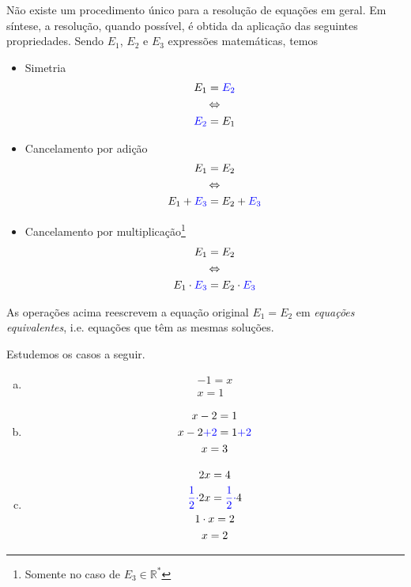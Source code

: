 Não existe um procedimento único para a resolução de equações em geral. Em síntese, a resolução, quando possível, é obtida da aplicação das seguintes propriedades. Sendo $E_1$, $E_2$ e $E_3$ expressões matemáticas, temos
\begin{itemize}
\item Simetria
  \begin{equation}
    \begin{gathered}
      E_1 = {\color{blue}E_2} \\
      \Leftrightarrow \\
      {\color{blue}E_2} = E_1
    \end{gathered}
\end{equation}
\item Cancelamento por adição
  \begin{equation}
    \begin{gathered}
      E_1 = E_2 \\
      \Leftrightarrow \\
      E_1 + {\color{blue}E_3} = E_2 + {\color{blue}E_3}
  \end{gathered}
\end{equation}
\item Cancelamento por multiplicação\footnote{Somente no caso de $E_3\in\mathbb{R}^*$}
  \begin{equation}
    \begin{gathered}
      E_1 = E_2 \\
      \Leftrightarrow \\
      E_1\cdot {\color{blue}E_3} = E_2 \cdot {\color{blue}E_3}
  \end{gathered}
  \end{equation}
\end{itemize}

As operações acima reescrevem a equação original $E_1 = E_2$ em \emph{equações equivalentes}, i.e. equações que têm as mesmas soluções.

\begin{ex}
  Estudemos os casos a seguir.
  \begin{enumerate}[a)]
  \item
    \begin{gather}
      -1 = x\\
      x = 1
    \end{gather}
  \item
    \begin{gather}
      x - 2 = 1\\
      x - 2 {\color{blue}+ 2} = 1 {\color{blue}+ 2}\\
      x = 3
    \end{gather}
  \item
    \begin{gather}
      2x = 4\\
      {\color{blue}\frac{1}{2}\cdot}2x = {\color{blue}\frac{1}{2}\cdot}4\\
      1\cdot x = 2\\
      x = 2
    \end{gather}
  \end{enumerate}
\end{ex}

